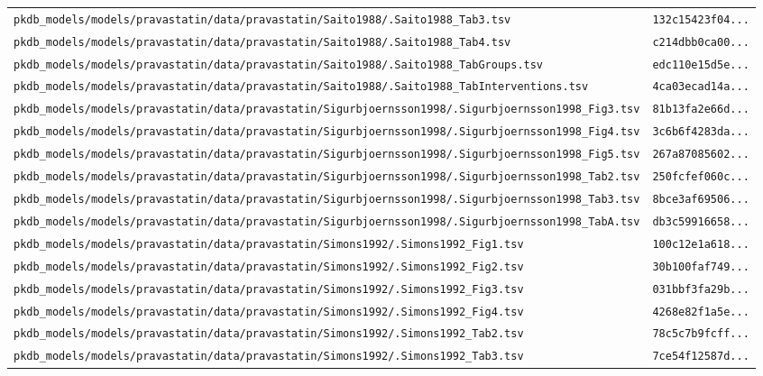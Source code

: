 \documentclass{article}
\begin{document}
\begin{longtable}{ll}
\texttt{pkdb\_models/models/pravastatin/data/pravastatin/Saito1988/.Saito1988\_Tab3.tsv} & \texttt{132c15423f04...} \\
\texttt{pkdb\_models/models/pravastatin/data/pravastatin/Saito1988/.Saito1988\_Tab4.tsv} & \texttt{c214dbb0ca00...} \\
\texttt{pkdb\_models/models/pravastatin/data/pravastatin/Saito1988/.Saito1988\_TabGroups.tsv} & \texttt{edc110e15d5e...} \\
\texttt{pkdb\_models/models/pravastatin/data/pravastatin/Saito1988/.Saito1988\_TabInterventions.tsv} & \texttt{4ca03ecad14a...} \\
\texttt{pkdb\_models/models/pravastatin/data/pravastatin/Sigurbjoernsson1998/.Sigurbjoernsson1998\_Fig3.tsv} & \texttt{81b13fa2e66d...} \\
\texttt{pkdb\_models/models/pravastatin/data/pravastatin/Sigurbjoernsson1998/.Sigurbjoernsson1998\_Fig4.tsv} & \texttt{3c6b6f4283da...} \\
\texttt{pkdb\_models/models/pravastatin/data/pravastatin/Sigurbjoernsson1998/.Sigurbjoernsson1998\_Fig5.tsv} & \texttt{267a87085602...} \\
\texttt{pkdb\_models/models/pravastatin/data/pravastatin/Sigurbjoernsson1998/.Sigurbjoernsson1998\_Tab2.tsv} & \texttt{250fcfef060c...} \\
\texttt{pkdb\_models/models/pravastatin/data/pravastatin/Sigurbjoernsson1998/.Sigurbjoernsson1998\_Tab3.tsv} & \texttt{8bce3af69506...} \\
\texttt{pkdb\_models/models/pravastatin/data/pravastatin/Sigurbjoernsson1998/.Sigurbjoernsson1998\_TabA.tsv} & \texttt{db3c59916658...} \\
\texttt{pkdb\_models/models/pravastatin/data/pravastatin/Simons1992/.Simons1992\_Fig1.tsv} & \texttt{100c12e1a618...} \\
\texttt{pkdb\_models/models/pravastatin/data/pravastatin/Simons1992/.Simons1992\_Fig2.tsv} & \texttt{30b100faf749...} \\
\texttt{pkdb\_models/models/pravastatin/data/pravastatin/Simons1992/.Simons1992\_Fig3.tsv} & \texttt{031bbf3fa29b...} \\
\texttt{pkdb\_models/models/pravastatin/data/pravastatin/Simons1992/.Simons1992\_Fig4.tsv} & \texttt{4268e82f1a5e...} \\
\texttt{pkdb\_models/models/pravastatin/data/pravastatin/Simons1992/.Simons1992\_Tab2.tsv} & \texttt{78c5c7b9fcff...} \\
\texttt{pkdb\_models/models/pravastatin/data/pravastatin/Simons1992/.Simons1992\_Tab3.tsv} & \texttt{7ce54f12587d...} \\

\end{longtable}
\end{document}
